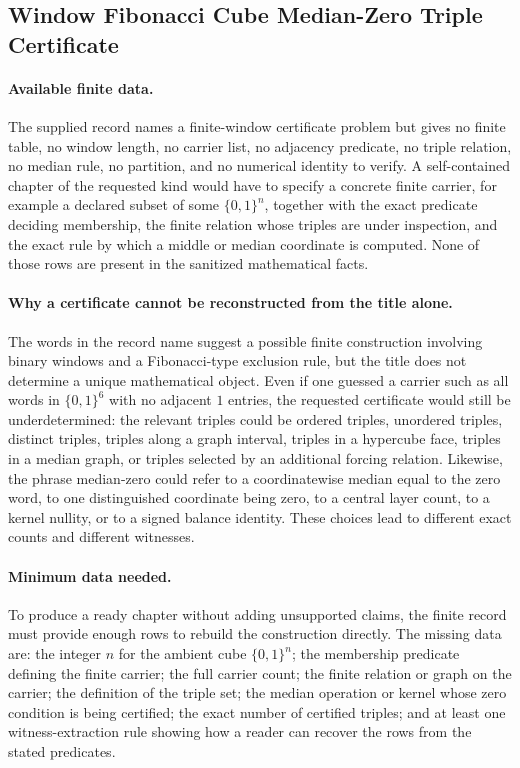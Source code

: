 \subsection{Window Fibonacci Cube Median-Zero Triple Certificate}\label{sec:window-fibonacci-cube-median-zero-triple-certificate}

\paragraph{Available finite data.}
The supplied record names a finite-window certificate problem but gives no finite table, no window length, no carrier list, no adjacency predicate, no triple relation, no median rule, no partition, and no numerical identity to verify. A self-contained chapter of the requested kind would have to specify a concrete finite carrier, for example a declared subset of some $\{0,1\}^n$, together with the exact predicate deciding membership, the finite relation whose triples are under inspection, and the exact rule by which a middle or median coordinate is computed. None of those rows are present in the sanitized mathematical facts.

\paragraph{Why a certificate cannot be reconstructed from the title alone.}
The words in the record name suggest a possible finite construction involving binary windows and a Fibonacci-type exclusion rule, but the title does not determine a unique mathematical object. Even if one guessed a carrier such as all words in $\{0,1\}^6$ with no adjacent $1$ entries, the requested certificate would still be underdetermined: the relevant triples could be ordered triples, unordered triples, distinct triples, triples along a graph interval, triples in a hypercube face, triples in a median graph, or triples selected by an additional forcing relation. Likewise, the phrase median-zero could refer to a coordinatewise median equal to the zero word, to one distinguished coordinate being zero, to a central layer count, to a kernel nullity, or to a signed balance identity. These choices lead to different exact counts and different witnesses.

\paragraph{Minimum data needed.}
To produce a ready chapter without adding unsupported claims, the finite record must provide enough rows to rebuild the construction directly. The missing data are: the integer $n$ for the ambient cube $\{0,1\}^n$; the membership predicate defining the finite carrier; the full carrier count; the finite relation or graph on the carrier; the definition of the triple set; the median operation or kernel whose zero condition is being certified; the exact number of certified triples; and at least one witness-extraction rule showing how a reader can recover the rows from the stated predicates.

